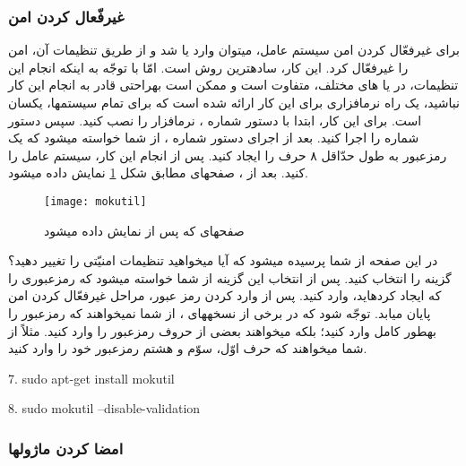 \subsubsection{غیرفّعال کردن   امن}
برای غیرفعّال کردن  امن سیستم عامل، می\nf توان وارد  یا  شد و از طریق تنظیمات آن،  امن را غیرفعّال کرد. این کار، ساده\nf ترین روش است. امّا با توجّه به این\nf که انجام این تنظیمات، در  یا  های مختلف، متفاوت است و ممکن است به\nf راحتی قادر به انجام این کار نباشید، یک راه نرم\nf افزاری برای این کار ارائه شده است که برای تمام سیستم\nf ها، یکسان است. برای این کار، ابتدا با دستور شماره ، نرم\nf افزار  را نصب کنید. سپس دستور شماره  را اجرا کنید. بعد از اجرای دستور شماره ، از شما خواسته می\nf شود که یک رمزعبور به طول حدّاقل ۸ حرف را ایجاد کنید. پس از انجام این کار، سیستم عامل را  کنید. بعد از ، صفحه\nf ای مطابق شکل \ref{mokutil} نمایش داده می\nf شود.
\begin{figure}[H]
\centering
\texttt{[image: mokutil]}
\caption{صفحه\nf ای که پس از  نمایش داده می\nf شود}
\label{mokutil}
\end{figure}

در این صفحه از شما پرسیده می\nf شود که آیا می\nf خواهید تنظیمات امنیّتی را تغییر دهید؟ گزینه  را انتخاب کنید. پس از انتخاب این گزینه از شما خواسته می\nf شود که رمزعبوری را که ایجاد کرده\nf اید، وارد کنید. پس از وارد کردن رمز عبور، مراحل غیرفعّال کردن  امن پایان میابد. توجّه شود که در برخی از نسخه\nf های ، از شما نمی\nf خواهند که رمزعبور را به\nf طور کامل وارد کنید؛ بلکه می\nf خواهند بعضی از حروف رمزعبور را وارد کنید. مثلاً از شما می\nf خواهند که حرف اوّل، سوّم و هشتم رمزعبور خود را وارد کنید.
\begin{latin}
\setlength{\parindent}{0ex}
7. sudo apt-get install mokutil

8. sudo mokutil --disable-validation
\end{latin} 

\subsubsection{امضا کردن ماژول\nf ها}

